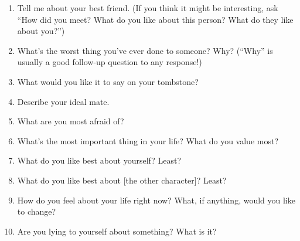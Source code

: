 \documentclass[openleft,oneside,showtrims]{memoir}
\begin{document}
\begin{enumerate}
\item Tell me about your best friend. (If you think it might be interesting, ask ``How did you meet? What do you like about this person? What do they like about you?'')

\item What's the worst thing you've ever done to someone? Why? (``Why'' is usually a good follow-up question to any response!)

\item What would you like it to say on your tombstone?

\item Describe your ideal mate.

\item What are you most afraid of?

\item What's the most important thing in your life? What do you value most?

\item What do you like best about yourself? Least?

\item What do you like best about [the other character]? Least?

\item How do you feel about your life right now? What, if anything, would you like to change?

\item Are you lying to yourself about something? What is it?
\end{enumerate}
\end{document}
